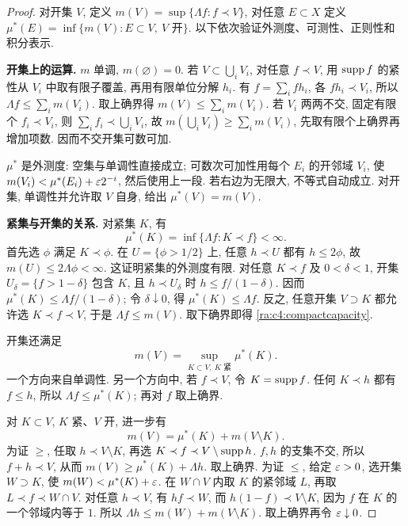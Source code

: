 \begin{proof}
对开集 $V$, 定义 $m(V)=\sup\{\Lambda f:f\prec V\}$, 对任意 $E\subset X$ 定义 $\mu^*(E)=\inf\{m(V):E\subset V,\ V\text{ 开}\}$. 以下依次验证外测度、可测性、正则性和积分表示.

\textbf{开集上的运算.} $m$ 单调, $m(\varnothing)=0$. 若 $V\subset\bigcup_iV_i$, 对任意 $f\prec V$, 用 $\operatorname{supp} f$ 的紧性从 $V_i$ 中取有限子覆盖, 再用有限单位分解 $h_i$. 有 $f=\sum_ifh_i$, 各 $fh_i\prec V_i$, 所以 $\Lambda f\le\sum_im(V_i)$. 取上确界得 $m(V)\le\sum_im(V_i)$. 若 $V_i$ 两两不交, 固定有限个 $f_i\prec V_i$, 则 $\sum_if_i\prec\bigcup_iV_i$, 故 $m(\bigcup_iV_i)\ge\sum_im(V_i)$, 先取有限个上确界再增加项数. 因而不交开集可数可加.

$\mu^*$ 是外测度: 空集与单调性直接成立; 可数次可加性用每个 $E_i$ 的开邻域 $V_i$, 使 $m(V_i)<\mu^*(E_i)+\varepsilon2^{-i}$, 然后使用上一段. 若右边为无限大, 不等式自动成立. 对开集, 单调性并允许取 $V$ 自身, 给出 $\mu^*(V)=m(V)$.

\textbf{紧集与开集的关系.} 对紧集 $K$, 有
\begin{equation}\label{ra:c4:compactcapacity}
 \mu^*(K)=\inf\{\Lambda f:K\prec f\}<\infty.
\end{equation}
首先选 $\phi$ 满足 $K\prec\phi$. 在 $U=\{\phi>1/2\}$ 上, 任意 $h\prec U$ 都有 $h\le2\phi$, 故 $m(U)\le2\Lambda\phi<\infty$. 这证明紧集的外测度有限. 对任意 $K\prec f$ 及 $0<\delta<1$, 开集 $U_\delta=\{f>1-\delta\}$ 包含 $K$, 且 $h\prec U_\delta$ 时 $h\le f/(1-\delta)$. 因而 $\mu^*(K)\le\Lambda f/(1-\delta)$; 令 $\delta\downarrow0$, 得 $\mu^*(K)\le\Lambda f$. 反之, 任意开集 $V\supset K$ 都允许选 $K\prec f\prec V$, 于是 $\Lambda f\le m(V)$. 取下确界即得 \eqref{ra:c4:compactcapacity}.

开集还满足
\begin{equation}\label{ra:c4:openinner}
 m(V)=\sup_{K\subset V,\ K\text{ 紧}}\mu^*(K).
\end{equation}
一个方向来自单调性. 另一个方向中, 若 $f\prec V$, 令 $K=\operatorname{supp} f$. 任何 $K\prec h$ 都有 $f\le h$, 所以 $\Lambda f\le\mu^*(K)$; 再对 $f$ 取上确界.

对 $K\subset V$, $K$ 紧、$V$ 开, 进一步有
\begin{equation}\label{ra:c4:opensplit}
 m(V)=\mu^*(K)+m(V\setminus K).
\end{equation}
为证 $\ge$, 任取 $h\prec V\setminus K$, 再选 $K\prec f\prec V\setminus\operatorname{supp} h$. $f,h$ 的支集不交, 所以 $f+h\prec V$, 从而 $m(V)\ge\mu^*(K)+\Lambda h$. 取上确界. 为证 $\le$, 给定 $\varepsilon>0$, 选开集 $W\supset K$, 使 $m(W)<\mu^*(K)+\varepsilon$. 在 $W\cap V$ 内取 $K$ 的紧邻域 $L$, 再取 $L\prec f\prec W\cap V$. 对任意 $h\prec V$, 有 $hf\prec W$, 而 $h(1-f)\prec V\setminus K$, 因为 $f$ 在 $K$ 的一个邻域内等于 $1$. 所以 $\Lambda h\le m(W)+m(V\setminus K)$. 取上确界再令 $\varepsilon\downarrow0$.


\end{proof}
